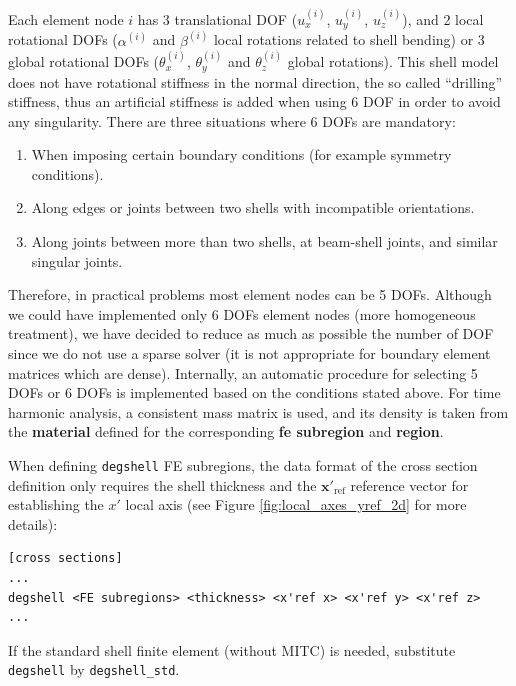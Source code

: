 \documentclass[a4paper,fleqn]{book}
\begin{document}
Each element node $i$ has 3 translational DOF ($u_x^{(i)}$, $u_y^{(i)}$, $u_z^{(i)}$), and 2 local rotational DOFs ($\alpha^{(i)}$ and $\beta^{(i)}$ local rotations related to shell bending) or 3 global rotational DOFs ($\theta_x^{(i)}$, $\theta_y^{(i)}$ and $\theta_z^{(i)}$ global rotations). This shell model does not have rotational stiffness in the normal direction, the so called ``drilling'' stiffness, thus an artificial stiffness is added when using 6 DOF \cite{bathe1996} in order to avoid any singularity. There are three situations where 6 DOFs are mandatory: 
\begin{enumerate}
  \item When imposing certain boundary conditions (for example symmetry conditions).
  \item Along edges or joints between two shells with incompatible orientations.
  \item Along joints between more than two shells, at beam-shell joints, and similar singular joints.
\end{enumerate}
Therefore, in practical problems most element nodes can be 5 DOFs. Although we could have implemented only 6 DOFs element nodes (more homogeneous treatment), we have decided to reduce as much as possible the number of DOF since we do not use a sparse solver (it is not appropriate for boundary element matrices which are dense). Internally, an automatic procedure for selecting 5 DOFs or 6 DOFs is implemented based on the conditions stated above. 
For time harmonic analysis,  a consistent mass matrix is used, and its density is taken from the \textbf{material} defined for the corresponding \textbf{fe subregion} and \textbf{region}.

When defining \texttt{degshell} FE subregions, the data format of the cross section definition only requires the shell thickness and the $\mathbf{x}'_\mathrm{ref}$ reference vector for establishing the $x'$ local axis (see Figure \ref{fig:local_axes_yref_2d} for more details):
\begin{Verbatim}[frame=single, fontsize=\small, label={format of section [cross sections] for degshell elements}]
[cross sections]
...
degshell <FE subregions> <thickness> <x'ref x> <x'ref y> <x'ref z>
...
\end{Verbatim}
If the standard shell finite element (without MITC) is needed, substitute \texttt{degshell} by \texttt{degshell\_std}.
\end{document}
